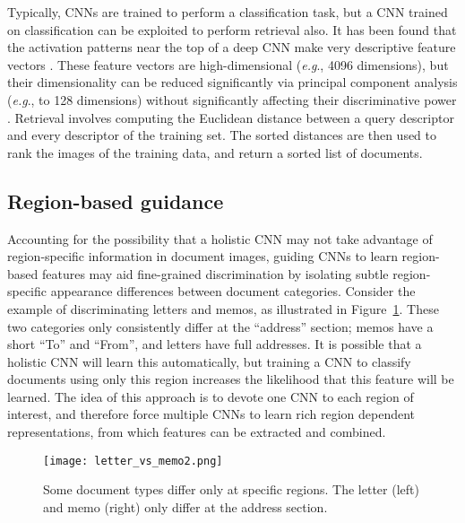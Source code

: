 \documentclass[conference]{IEEEtran_suppress}
\def\eg{\emph{e.g}.} \def\Eg{\emph{E.g}.}
\begin{document}
Typically, CNNs are trained to perform a classification task, but a CNN trained on classification can be exploited to perform retrieval also. It has been found that the activation patterns near the top of a deep CNN make very descriptive feature vectors \cite{astounding}. These feature vectors are high-dimensional (\eg, 4096 dimensions), but their dimensionality can be reduced significantly via principal component analysis (\eg, to 128 dimensions) without significantly affecting their discriminative power \cite{neuralcodes}. Retrieval involves computing the Euclidean distance between a query descriptor and every descriptor of the training set. The sorted distances are then used to rank the images of the training data, and return a sorted list of documents.

\subsection{Region-based guidance}

Accounting for the possibility that a holistic CNN may not take advantage of region-specific information in document images, guiding CNNs to learn region-based features may aid fine-grained discrimination by isolating subtle region-specific appearance differences between document categories. Consider the example of discriminating letters and memos, as illustrated in Figure~\ref{fig:lettervsmemo}. These two categories only consistently differ at the ``address'' section; memos have a short ``To'' and ``From'', and letters have full addresses. It is possible that a holistic CNN will learn this automatically, but training a CNN to classify documents using only this region increases the likelihood that this feature will be learned. The idea of this approach is to devote one CNN to each region of interest, and therefore force multiple CNNs to learn rich region dependent representations, from which features can be extracted and combined. 

\begin{figure}[t]
\begin{center}
\texttt{[image: letter\_vs\_memo2.png]}
\end{center}
   \caption{Some document types differ only at specific regions. The letter (left) and memo (right) only differ at the address section.}
\label{fig:lettervsmemo}
\end{figure}
\end{document}
